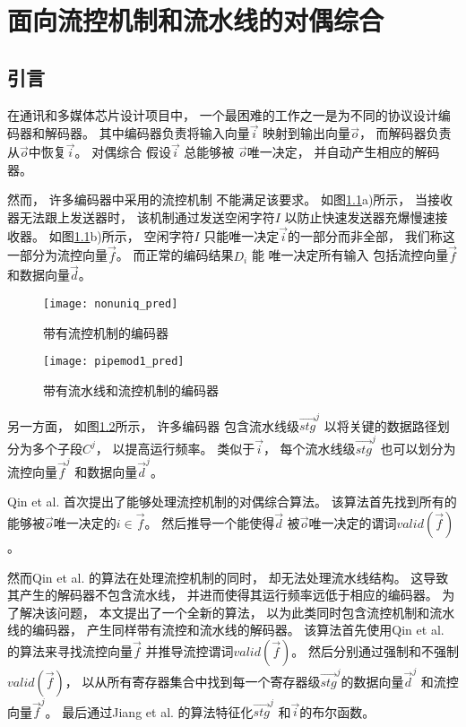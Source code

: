 


\chapter{面向流控机制和流水线的对偶综合}
\label{chap:4}

\section{引言}\label{sec_intro}
在通讯和多媒体芯片设计项目中，
一个最困难的工作之一是为不同的协议设计编码器和解码器。
其中编码器负责将输入向量$\vec{i}$ 映射到输出向量$\vec{o}$，
而解码器负责从$\vec{o}$中恢复$\vec{i}$。
对偶综合
假设$\vec{i}$ 总能够被 $\vec{o}$唯一决定，
并自动产生相应的解码器。

然而，
许多编码器中采用的流控机制
不能满足该要求。
如图\ref{fig_fc}a)所示，
当接收器无法跟上发送器时，
该机制通过发送空闲字符$I$ 以防止快速发送器充爆慢速接收器。
如图\ref{fig_fc}b)所示，
空闲字符$I$
只能唯一决定$\vec{i}$的一部分而非全部，
我们称这一部分为流控向量$\vec{f}$。
而正常的编码结果$D_i$ 能
唯一决定所有输入
包括流控向量$\vec{f}$ 和数据向量$\vec{d}$。


\begin{figure}[t]
\centering
\texttt{[image: nonuniq\_pred]}
\caption{带有流控机制的编码器}
\label{fig_fc}
\end{figure}

\begin{figure}[b]
\centering
\texttt{[image: pipemod1\_pred]}
\caption{带有流水线和流控机制的编码器}
\label{fig_pipeenc}
\end{figure}



另一方面，
如图\ref{fig_pipeenc}所示，
许多编码器
包含流水线级$\vec{stg}^j$ 以将关键的数据路径划分为多个子段$C^j$，
以提高运行频率。
类似于$\vec{i}$，
每个流水线级$\vec{stg}^j$ 也可以划分为流控向量$\vec{f}^j$ 和数据向量$\vec{d}^j$。

Qin et al.  首次提出了能够处理流控机制的对偶综合算法。
该算法首先找到所有的能够被$\vec{o}$唯一决定的$i\in\vec{f}$。
然后推导一个能使得$\vec{d}$ 被$\vec{o}$唯一决定的谓词$valid(\vec{f})$。

然而Qin et al. 的算法在处理流控机制的同时，
却无法处理流水线结构。
这导致其产生的解码器不包含流水线，
并进而使得其运行频率远低于相应的编码器。
为了解决该问题，
本文提出了一个全新的算法，
以为此类同时包含流控机制和流水线的编码器，
产生同样带有流控和流水线的解码器。
该算法首先使用Qin et al. 的算法来寻找流控向量$\vec{f}$ 并推导流控谓词$valid(\vec{f})$。
然后分别通过强制和不强制$valid(\vec{f})$，
以从所有寄存器集合中找到每一个寄存器级$\vec{stg}^j$的数据向量$\vec{d}^j$ 和流控向量$\vec{f}^j$。
最后通过Jiang et al. 的算法特征化$\vec{stg}^j$ 和$\vec{i}$的布尔函数。

